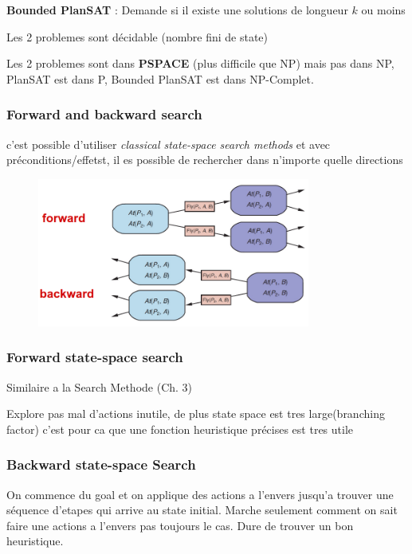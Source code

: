 			\textbf{Bounded PlanSAT} : Demande si il existe une solutions de longueur $k$ ou moins
			
			Les 2 problemes sont décidable (nombre fini de state)
			
			Les 2 problemes sont dans \textbf{PSPACE} (plus difficile que NP) mais pas dans NP, PlanSAT est dans P, Bounded PlanSAT est dans NP-Complet.
			
		\subsubsection{Forward and backward search}
			c'est possible d'utiliser \textit{classical state-space search methods} et avec préconditions/effetst, il es possible de rechercher dans n'importe quelle directions
			
			\begin{figure}[htp]	
				\centering
				\includegraphics[width=0.8\textwidth]{img/FBSearch.png}
			\end{figure}
			
		\subsubsection{Forward state-space search}
			Similaire a la Search Methode (Ch. 3)
			
			Explore pas mal d'actions inutile, de plus state space est tres large(branching factor) c'est pour ca que une fonction heuristique précises est tres utile
			
		\subsubsection{Backward state-space Search}
			On commence du goal et on applique des actions a l'envers jusqu'a trouver une séquence d'etapes qui arrive au state initial. Marche seulement comment on sait faire une actions a l'envers pas toujours le cas. Dure de trouver un bon heuristique.
			
